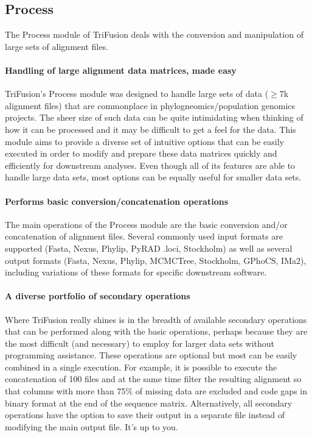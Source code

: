 \documentclass[12pt]{article}
\begin{document}
\subsection{Process}

The Process module of TriFusion deals with the conversion and manipulation of large sets of alignment files. 

\paragraph{Handling of large alignment data matrices, made easy}

TriFusion's Process module was designed to handle large sets of data ($\geq$7k alignment files) that are commonplace in phylogneomics/population genomics projects. The sheer size of such data can be quite intimidating when thinking of how it can be processed and it may be difficult to get a feel for the data. This module aims to provide a diverse set of intuitive options that can be easily executed in order to modify and prepare these data matrices quickly and efficiently for downstream analyses. Even though all of its features are able to handle large data sets, most options can be equally useful for smaller data sets.

\paragraph{Performs basic conversion/concatenation operations}

The main operations of the Process module are the basic conversion and/or concatenation of alignment files. Several commonly used input formats are supported (Fasta, Nexus, Phylip, PyRAD .loci, Stockholm) as well as several output formats (Fasta, Nexus, Phylip, MCMCTree, Stockholm, GPhoCS, IMa2), including variations of these formats for specific downstream software.

\paragraph{A diverse portfolio of secondary operations}

Where TriFusion really shines is in the breadth of available secondary operations that can be performed along with the basic operations, perhaps because they are the most difficult (and necessary) to employ for larger data sets without programming assistance. These operations are optional but most can be easily combined in a single execution. For example, it is possible to execute the concatenation of 100 files and at the same time filter the resulting alignment so that columns with more than 75\% of missing data are excluded and code gaps in binary format at the end of the sequence matrix. Alternatively, all secondary operations have the option to save their output in a separate file instead of modifying the main output file. It's up to you. 
\end{document}
